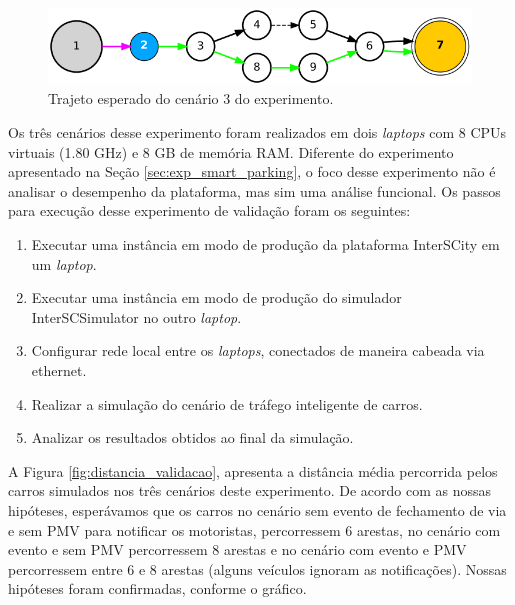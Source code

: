 \begin{figure}[ht]
	\centering
	\includegraphics[width=\textwidth]{figuras/mapa_etapa3.png}
	\caption{Trajeto esperado do cenário 3 do experimento.}
	\label{fig:mapa_etapa3}
\end{figure}

Os três cenários desse experimento foram realizados em dois \textit{laptops} com 8 CPUs virtuais (1.80 GHz) e 8 GB de memória RAM.
Diferente do experimento apresentado na Seção \ref{sec:exp_smart_parking}, o foco desse experimento não é analisar o desempenho da plataforma, mas sim uma análise funcional. 
Os passos para execução desse experimento de validação foram os seguintes:

\begin{enumerate}
    \item Executar uma instância em modo de produção da plataforma InterSCity em um \textit{laptop}.

    \item Executar uma instância em modo de produção do simulador InterSCSimulator no outro \textit{laptop}.

    \item Configurar rede local entre os \textit{laptops}, conectados de maneira cabeada via ethernet.

    \item Realizar a simulação do cenário de tráfego inteligente de carros.

    \item Analizar os resultados obtidos ao final da simulação.
\end{enumerate}

A Figura \ref{fig:distancia_validacao}, apresenta a distância média percorrida pelos carros simulados nos três cenários deste experimento.
De acordo com as nossas hipóteses, esperávamos que os carros no cenário sem evento de fechamento de via e sem PMV para notificar os motoristas, percorressem 6 arestas, no cenário com evento e sem PMV
percorressem 8 arestas e no cenário com evento e PMV percorressem entre 6 e 8 arestas (alguns veículos ignoram as notificações).
Nossas hipóteses foram confirmadas, conforme o gráfico.

